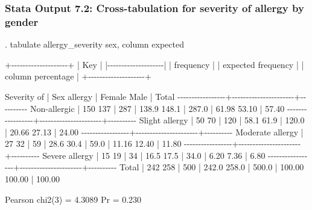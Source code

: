 \documentclass[
]{memoir}
\newenvironment{Shaded}{\begin{snugshade}}{\end{snugshade}}
\newcommand{\NormalTok}[1]{#1}
\begin{document}
\hypertarget{stata-output-7.2-cross-tabulation-for-severity-of-allergy-by-gender}{%
\subsubsection*{Stata Output 7.2: Cross-tabulation for severity of allergy by gender}\label{stata-output-7.2-cross-tabulation-for-severity-of-allergy-by-gender}}

\begin{Shaded}
\begin{Highlighting}[]
\NormalTok{. tabulate allergy\_severity sex, column expected}

\NormalTok{+{-}{-}{-}{-}{-}{-}{-}{-}{-}{-}{-}{-}{-}{-}{-}{-}{-}{-}{-}{-}+}
\NormalTok{| Key                |}
\NormalTok{|{-}{-}{-}{-}{-}{-}{-}{-}{-}{-}{-}{-}{-}{-}{-}{-}{-}{-}{-}{-}|}
\NormalTok{|     frequency      |}
\NormalTok{| expected frequency |}
\NormalTok{| column percentage  |}
\NormalTok{+{-}{-}{-}{-}{-}{-}{-}{-}{-}{-}{-}{-}{-}{-}{-}{-}{-}{-}{-}{-}+}

\NormalTok{     Severity of |          Sex}
\NormalTok{         allergy |    Female       Male |     Total}
\NormalTok{{-}{-}{-}{-}{-}{-}{-}{-}{-}{-}{-}{-}{-}{-}{-}{-}{-}+{-}{-}{-}{-}{-}{-}{-}{-}{-}{-}{-}{-}{-}{-}{-}{-}{-}{-}{-}{-}{-}{-}+{-}{-}{-}{-}{-}{-}{-}{-}{-}{-}}
\NormalTok{    Non{-}allergic |       150        137 |       287 }
\NormalTok{                 |     138.9      148.1 |     287.0 }
\NormalTok{                 |     61.98      53.10 |     57.40 }
\NormalTok{{-}{-}{-}{-}{-}{-}{-}{-}{-}{-}{-}{-}{-}{-}{-}{-}{-}+{-}{-}{-}{-}{-}{-}{-}{-}{-}{-}{-}{-}{-}{-}{-}{-}{-}{-}{-}{-}{-}{-}+{-}{-}{-}{-}{-}{-}{-}{-}{-}{-}}
\NormalTok{  Slight allergy |        50         70 |       120 }
\NormalTok{                 |      58.1       61.9 |     120.0 }
\NormalTok{                 |     20.66      27.13 |     24.00 }
\NormalTok{{-}{-}{-}{-}{-}{-}{-}{-}{-}{-}{-}{-}{-}{-}{-}{-}{-}+{-}{-}{-}{-}{-}{-}{-}{-}{-}{-}{-}{-}{-}{-}{-}{-}{-}{-}{-}{-}{-}{-}+{-}{-}{-}{-}{-}{-}{-}{-}{-}{-}}
\NormalTok{Moderate allergy |        27         32 |        59 }
\NormalTok{                 |      28.6       30.4 |      59.0 }
\NormalTok{                 |     11.16      12.40 |     11.80 }
\NormalTok{{-}{-}{-}{-}{-}{-}{-}{-}{-}{-}{-}{-}{-}{-}{-}{-}{-}+{-}{-}{-}{-}{-}{-}{-}{-}{-}{-}{-}{-}{-}{-}{-}{-}{-}{-}{-}{-}{-}{-}+{-}{-}{-}{-}{-}{-}{-}{-}{-}{-}}
\NormalTok{  Severe allergy |        15         19 |        34 }
\NormalTok{                 |      16.5       17.5 |      34.0 }
\NormalTok{                 |      6.20       7.36 |      6.80 }
\NormalTok{{-}{-}{-}{-}{-}{-}{-}{-}{-}{-}{-}{-}{-}{-}{-}{-}{-}+{-}{-}{-}{-}{-}{-}{-}{-}{-}{-}{-}{-}{-}{-}{-}{-}{-}{-}{-}{-}{-}{-}+{-}{-}{-}{-}{-}{-}{-}{-}{-}{-}}
\NormalTok{           Total |       242        258 |       500 }
\NormalTok{                 |     242.0      258.0 |     500.0 }
\NormalTok{                 |    100.00     100.00 |    100.00}

\NormalTok{          Pearson chi2(3) =   4.3089   Pr = 0.230}
\end{Highlighting}
\end{Shaded}
\end{document}
